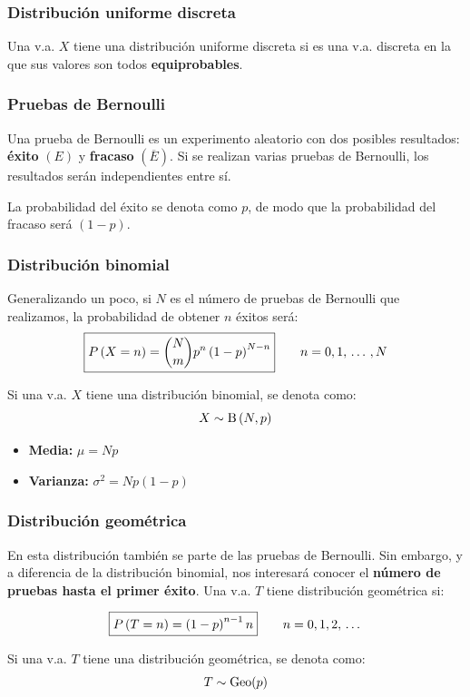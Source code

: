 \documentclass[a4paper]{book}
\begin{document}
\subsubsection{Distribución uniforme discreta}
Una v.a. $X$ tiene una distribución uniforme discreta si es una v.a. discreta en la que sus valores son todos \textbf{equiprobables}.

\subsubsection{Pruebas de Bernoulli}
Una prueba de Bernoulli es un experimento aleatorio con dos posibles resultados: \textbf{éxito} $(E)$ y \textbf{fracaso} $(\overline{E})$. Si se realizan varias pruebas de Bernoulli, los resultados serán independientes entre sí.

La probabilidad del éxito se denota como $p$, de modo que la probabilidad del fracaso será $(1-p)$.

\subsubsection{Distribución binomial}
Generalizando un poco, si $N$ es el número de pruebas de Bernoulli que realizamos, la probabilidad de obtener $n$ éxitos será: \[\boxed{P\left( X=n \right)={\binom{N}{m}} p^n\left( 1-p \right)^{N-n}} \qquad n= 0,1,\, \ldots \, , N\]

Si una v.a. $X$ tiene una distribución binomial, se denota como: \[X \sim \operatorname{B} \left( N,p \right)\]

\begin{itemize}
	\item \textbf{Media:} $\mu = Np$
	\item \textbf{Varianza:} $\sigma ^2 = Np(1-p)$
\end{itemize}

\subsubsection{Distribución geométrica}
En esta distribución también se parte de las pruebas de Bernoulli. Sin embargo, y a diferencia de la distribución binomial, nos interesará conocer el \textbf{número de pruebas hasta el primer éxito}. Una v.a. $T$ tiene distribución geométrica si:

\[\boxed{P\left( T=n \right)= \left( 1-p \right)^{n-1}n} \qquad n= 0,1,2,\, \ldots \,\]

Si una v.a. $T$ tiene una distribución geométrica, se denota como: \[T \sim \operatorname{Geo}(p)\]
\end{document}
